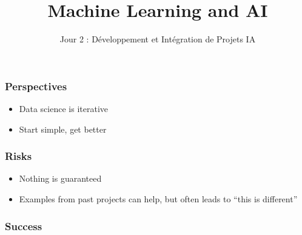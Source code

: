 
\title{Machine Learning and AI}
\subtitle{Jour 2 : Développement et Intégration de Projets IA}



\begin{frame}
  \titlepage
\end{frame}



\begin{frame}[t]
  \frametitle{Perspectives}

  \vspace{1cm}
  \begin{itemize}
  \item Data science is iterative
  \item Start simple, get better
  \end{itemize}

\end{frame}

\begin{frame}[t]
  \frametitle{Risks}

  \vspace{1cm}
  \begin{itemize}
  \item Nothing is guaranteed
  \item Examples from past projects can help, but often leads to ``this is different''
  \end{itemize}
\end{frame}

\begin{frame}[t]
  \frametitle{Success}
  \vspace{2cm}
  \centerline{}
  \vspace{1cm}
\end{frame}


